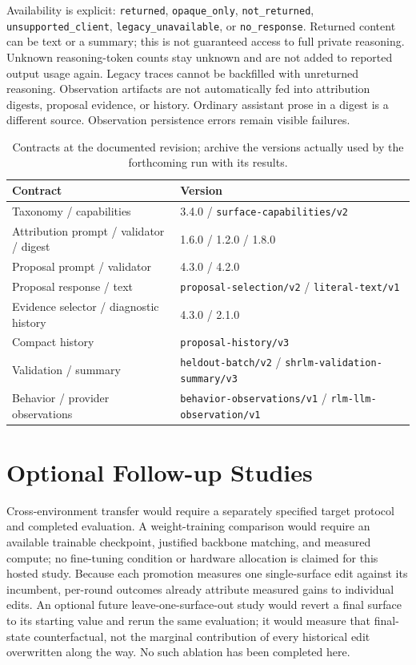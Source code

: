 Availability is explicit: \texttt{returned}, \texttt{opaque\_only},
\texttt{not\_returned}, \texttt{unsupported\_client},
\texttt{legacy\_unavailable}, or \texttt{no\_response}. Returned content can be
text or a summary; this is not guaranteed access to full private reasoning.
Unknown reasoning-token counts stay unknown and are not added to reported output
usage again. Legacy traces cannot be backfilled with unreturned reasoning.
Observation artifacts are not automatically fed into attribution digests,
proposal evidence, or history. Ordinary assistant prose in a digest is a
different source. Observation persistence errors remain visible failures.

\begin{table}[t]
\centering\small
\begin{tabularx}{\textwidth}{@{}Xl@{}}
\toprule
Contract & Version \\
\midrule
Taxonomy / capabilities & 3.4.0 / \texttt{surface-capabilities/v2} \\
Attribution prompt / validator / digest & 1.6.0 / 1.2.0 / 1.8.0 \\
Proposal prompt / validator & 4.3.0 / 4.2.0 \\
Proposal response / text & \texttt{proposal-selection/v2} / \texttt{literal-text/v1} \\
Evidence selector / diagnostic history & 4.3.0 / 2.1.0 \\
Compact history & \texttt{proposal-history/v3} \\
Validation / summary & \texttt{heldout-batch/v2} / \texttt{shrlm-validation-summary/v3} \\
Behavior / provider observations & \texttt{behavior-observations/v1} / \texttt{rlm-llm-observation/v1} \\
\bottomrule
\end{tabularx}
\caption{Contracts at the documented revision; archive the versions actually
used by the forthcoming run with its results.}
\end{table}

\section{Optional Follow-up Studies}
\label{app:extensions}
\label{app:finetune}
\label{app:alignment}

Cross-environment transfer would require a separately specified target protocol
and completed evaluation. A weight-training comparison would require an available
trainable checkpoint, justified backbone matching, and measured compute; no
fine-tuning condition or hardware allocation is claimed for this hosted study.
Because each promotion measures one single-surface edit against its incumbent,
per-round outcomes already attribute measured gains to individual edits. An optional future
leave-one-surface-out study would revert a final surface to its starting value
and rerun the same evaluation; it would measure that final-state counterfactual,
not the marginal contribution of every historical edit overwritten along the way.
No such ablation has been completed here.

